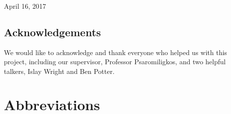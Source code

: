 \documentclass[11pt]{article}
\begin{document}
\begin{titlepage}
	
	
	\vfill\vfill\vfill %
	
	{\large April 16, 2017} 
	
	\vfill %
\end{titlepage}
\begin{abstract}

\end{abstract}
\pagebreak

\begin{center}
\section*{Acknowledgements}
\end{center}
We would like to acknowledge and thank everyone who helped us with this project, including our supervisor, Professor Psaromiligkos, and two helpful talkers, Islay Wright and Ben Potter.
\pagebreak
\tableofcontents
\pagebreak
\cleardoublepage
{}
\listoffigures
\pagebreak
\section*{Abbreviations}


\pagebreak
\end{document}
